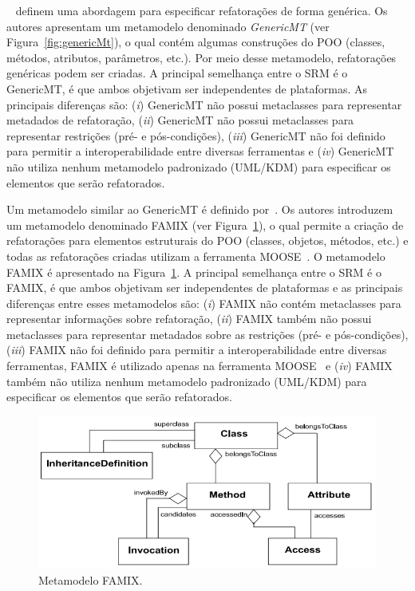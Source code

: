 ~ definem uma abordagem para especificar refatorações de forma genérica. Os autores apresentam um metamodelo denominado \textit{GenericMT} (ver Figura~\ref{fig:genericMt}), o qual contém algumas construções do POO (classes, métodos, atributos, parâmetros, etc.). Por meio desse metamodelo, refatorações genéricas podem ser criadas. A principal semelhança entre o SRM é o GenericMT, é que ambos objetivam ser independentes de plataformas. As principais diferenças são: (\textit{i}) GenericMT não possui metaclasses para representar metadados de refatoração, (\textit{ii}) GenericMT não possui metaclasses para representar restrições (pré- e pós-condições),  (\textit{iii}) GenericMT não foi definido para permitir a interoperabilidade entre diversas ferramentas e (\textit{iv}) GenericMT não utiliza nenhum metamodelo padronizado (UML/KDM) para especificar os elementos que serão refatorados.


Um metamodelo similar ao GenericMT é definido por~. Os autores introduzem um metamodelo denominado FAMIX (ver Figura~\ref{fig:famixMetamodel}), o qual permite a criação de refatorações para elementos estruturais do POO (classes, objetos, métodos, etc.) e todas as refatorações criadas utilizam a ferramenta MOOSE~\cite{ducasse2005moose}. O metamodelo FAMIX é apresentado na Figura~\ref{fig:famixMetamodel}. A principal semelhança entre o SRM é o FAMIX, é que ambos objetivam ser independentes de plataformas e as principais diferenças entre esses metamodelos são: (\textit{i}) FAMIX não contém metaclasses para representar informações sobre refatoração, (\textit{ii}) FAMIX também não possui metaclasses para representar metadados sobre as restrições (pré- e pós-condições),  (\textit{iii}) FAMIX não foi definido para permitir a interoperabilidade entre diversas ferramentas, FAMIX é utilizado apenas na ferramenta MOOSE~\cite{ducasse2005moose} e (\textit{iv}) FAMIX também não utiliza nenhum metamodelo padronizado (UML/KDM) para especificar os elementos que serão refatorados.

\begin{figure}[h]
	\centering
	\caption{Metamodelo FAMIX.}
	\label{fig:famixMetamodel}
	\includegraphics[scale=0.45]{images/FAMIXMetamodelRelated}
\end{figure}



